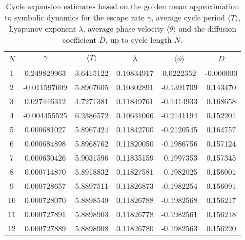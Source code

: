 \begin{table}
    \begin{tabular}{c|c|c|c|c|c}
     $N$ & $\gamma$ & $\langle T \rangle$ & $\lambda$ & $\langle \dot{\phi} \rangle$ & $D$ \\ 
    \hline
    1 & 0.249829963 & 3.6415122 & 0.10834917 & 0.0222352 & -0.000000 \\ 
    2 & -0.011597609 & 5.8967605 & 0.10302891 & -0.1391709 & 0.143470 \\ 
    3 & 0.027446312 & 4.7271381 & 0.11849761 & -0.1414933 & 0.168658 \\ 
    4 & -0.004455525 & 6.2386572 & 0.10631066 & -0.2141194 & 0.152201 \\ 
    5 & 0.000681027 & 5.8967424 & 0.11842700 & -0.2120545 & 0.164757 \\ 
    6 & 0.000684898 & 5.8968762 & 0.11820050 & -0.1986756 & 0.157124 \\ 
    7 & 0.000630426 & 5.9031596 & 0.11835159 & -0.1997353 & 0.157345 \\ 
    8 & 0.000714870 & 5.8918832 & 0.11827581 & -0.1982025 & 0.156001 \\ 
    9 & 0.000728657 & 5.8897511 & 0.11826873 & -0.1982254 & 0.156091 \\ 
    10 & 0.000728070 & 5.8898549 & 0.11826788 & -0.1982568 & 0.156217 \\ 
    11 & 0.000727891 & 5.8898903 & 0.11826778 & -0.1982561 & 0.156218 \\ 
    12 & 0.000727889 & 5.8898908 & 0.11826780 & -0.1982563 & 0.156220 \\ 
    \end{tabular}
    \caption{Cycle expansion estimates based on the golden mean approximation
              to symbolic dynamics for
             the escape rate $\gamma$, average cycle period $\langle T \rangle$,
             Lyapunov exponent $\lambda$, average phase velocity
             $\langle \dot{\theta} \rangle$ and the diffusion coefficient $D$,
             up to cycle length $N$.}
    \label{t-DynamicalAverages}
\end{table}
